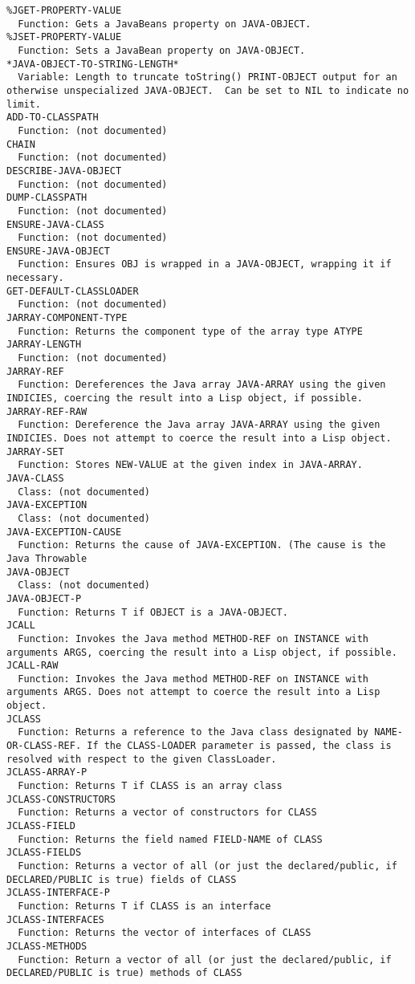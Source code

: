 \begin{verbatim}
%JGET-PROPERTY-VALUE
  Function: Gets a JavaBeans property on JAVA-OBJECT.
%JSET-PROPERTY-VALUE
  Function: Sets a JavaBean property on JAVA-OBJECT.
*JAVA-OBJECT-TO-STRING-LENGTH*
  Variable: Length to truncate toString() PRINT-OBJECT output for an otherwise unspecialized JAVA-OBJECT.  Can be set to NIL to indicate no limit.
ADD-TO-CLASSPATH
  Function: (not documented)
CHAIN
  Function: (not documented)
DESCRIBE-JAVA-OBJECT
  Function: (not documented)
DUMP-CLASSPATH
  Function: (not documented)
ENSURE-JAVA-CLASS
  Function: (not documented)
ENSURE-JAVA-OBJECT
  Function: Ensures OBJ is wrapped in a JAVA-OBJECT, wrapping it if necessary.
GET-DEFAULT-CLASSLOADER
  Function: (not documented)
JARRAY-COMPONENT-TYPE
  Function: Returns the component type of the array type ATYPE
JARRAY-LENGTH
  Function: (not documented)
JARRAY-REF
  Function: Dereferences the Java array JAVA-ARRAY using the given INDICIES, coercing the result into a Lisp object, if possible.
JARRAY-REF-RAW
  Function: Dereference the Java array JAVA-ARRAY using the given INDICIES. Does not attempt to coerce the result into a Lisp object.
JARRAY-SET
  Function: Stores NEW-VALUE at the given index in JAVA-ARRAY.
JAVA-CLASS
  Class: (not documented)
JAVA-EXCEPTION
  Class: (not documented)
JAVA-EXCEPTION-CAUSE
  Function: Returns the cause of JAVA-EXCEPTION. (The cause is the Java Throwable
JAVA-OBJECT
  Class: (not documented)
JAVA-OBJECT-P
  Function: Returns T if OBJECT is a JAVA-OBJECT.
JCALL
  Function: Invokes the Java method METHOD-REF on INSTANCE with arguments ARGS, coercing the result into a Lisp object, if possible.
JCALL-RAW
  Function: Invokes the Java method METHOD-REF on INSTANCE with arguments ARGS. Does not attempt to coerce the result into a Lisp object.
JCLASS
  Function: Returns a reference to the Java class designated by NAME-OR-CLASS-REF. If the CLASS-LOADER parameter is passed, the class is resolved with respect to the given ClassLoader.
JCLASS-ARRAY-P
  Function: Returns T if CLASS is an array class
JCLASS-CONSTRUCTORS
  Function: Returns a vector of constructors for CLASS
JCLASS-FIELD
  Function: Returns the field named FIELD-NAME of CLASS
JCLASS-FIELDS
  Function: Returns a vector of all (or just the declared/public, if DECLARED/PUBLIC is true) fields of CLASS
JCLASS-INTERFACE-P
  Function: Returns T if CLASS is an interface
JCLASS-INTERFACES
  Function: Returns the vector of interfaces of CLASS
JCLASS-METHODS
  Function: Return a vector of all (or just the declared/public, if DECLARED/PUBLIC is true) methods of CLASS

\end{verbatim}
